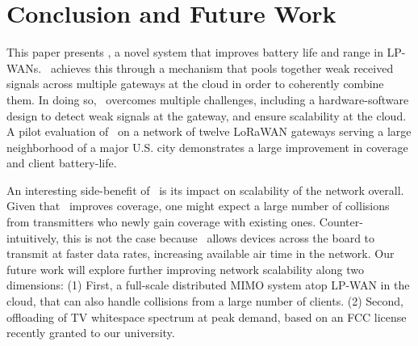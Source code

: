 \section{Conclusion and Future Work}
\label{sec:conclusion}


This paper presents \name, a novel system that improves battery life and range in LP-WANs. \name\ achieves this through a mechanism that pools together weak received signals across multiple gateways at the cloud in order to coherently combine them. In doing so, \name\ overcomes multiple challenges, including a hardware-software design to detect weak signals at the gateway, and ensure scalability at the cloud. A pilot evaluation of \name\ on a network of twelve LoRaWAN gateways serving a large neighborhood of a major U.S. city demonstrates a large improvement in coverage and client battery-life.

An interesting side-benefit of \name\ is its impact on scalability of the network overall. Given that \name\ improves coverage, one might expect a large number of collisions from transmitters who newly gain coverage with existing ones. Counter-intuitively, this is not the case because \name\ allows devices across the board to transmit at faster data rates, increasing available air time in the network. Our future work will explore further improving network scalability along two dimensions: (1) First, a full-scale distributed MIMO system atop LP-WAN in the cloud, that can also handle collisions from a large number of clients. (2) Second, offloading of TV whitespace spectrum at peak demand, based on an FCC license recently granted to our university.  



